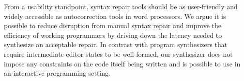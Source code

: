 \documentclass[sigplan,review,acmsmall,nonacm,anonymous]{acmart}\settopmatter{printfolios=false,printccs=false,printacmref=false}
\begin{document}



  From a usability standpoint, syntax repair tools should be as user-friendly and widely accessible as autocorrection tools in word processors. We argue it is possible to reduce disruption from manual syntax repair and improve the efficiency of working programmers by driving down the latency needed to synthesize an acceptable repair. In contrast with program synthesizers that require intermediate editor states to be well-formed, our synthesizer does not impose any constraints on the code itself being written and is possible to use in an interactive programming setting.
\end{document}
